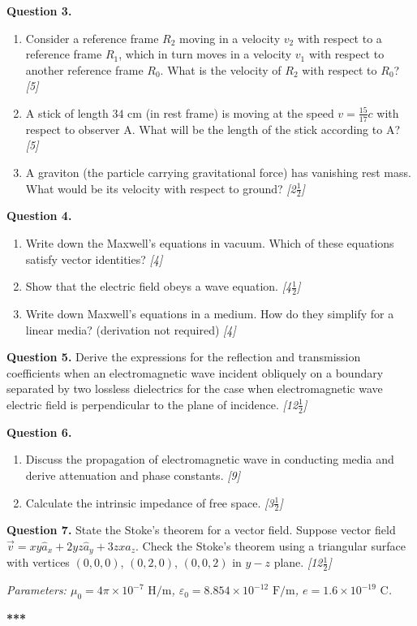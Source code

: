 \documentclass[11pt,a4paper]{article}
\newcommand{\pts}[1]{\hfill \textit{[#1]}}
\begin{document}
\bigskip

\noindent \textbf{Question 3.}
\begin{enumerate}[label=(\alph*)]
  \item Consider a reference frame $R_2$ moving in a velocity $v_2$ with respect to a reference frame $R_1$, which in turn moves in a velocity $v_1$ with respect to another reference frame $R_0$. What is the velocity of $R_2$ with respect to $R_0$? \pts{5}
  \item A stick of length $34\text{ cm}$ (in rest frame) is moving at the speed $v = \frac{15}{17}c$ with respect to observer A. What will be the length of the stick according to A? \pts{5}
  \item A graviton (the particle carrying gravitational force) has vanishing rest mass. What would be its velocity with respect to ground? \pts{2$\frac{1}{2}$}
\end{enumerate}

\bigskip

\noindent \textbf{Question 4.}
\begin{enumerate}[label=(\alph*)]
  \item Write down the Maxwell's equations in vacuum. Which of these equations satisfy vector identities? \pts{4}
  \item Show that the electric field obeys a wave equation. \pts{4$\frac{1}{2}$}
  \item Write down Maxwell's equations in a medium. How do they simplify for a linear media? (derivation not required) \pts{4}
\end{enumerate}

\bigskip

\noindent \textbf{Question 5.} Derive the expressions for the reflection and transmission coefficients when an electromagnetic wave incident obliquely on a boundary separated by two lossless dielectrics for the case when electromagnetic wave electric field is perpendicular to the plane of incidence. \pts{12$\frac{1}{2}$}

\bigskip

\noindent \textbf{Question 6.}
\begin{enumerate}[label=(\alph*)]
  \item Discuss the propagation of electromagnetic wave in conducting media and derive attenuation and phase constants. \pts{9}
  \item Calculate the intrinsic impedance of free space. \pts{3$\frac{1}{2}$}
\end{enumerate}

\bigskip

\noindent \textbf{Question 7.} State the Stoke's theorem for a vector field. Suppose vector field $\vec{v} = xy \hat{a}_x + 2yz \hat{a}_y + 3zx \hat{a}_z$. Check the Stoke's theorem using a triangular surface with vertices $(0,0,0)$, $(0,2,0)$, $(0,0,2)$ in $y-z$ plane. \pts{12$\frac{1}{2}$}

\smallskip
\noindent \textit{Parameters: $\mu_0 = 4\pi \times 10^{-7}\text{ H/m}$, $\varepsilon_0 = 8.854 \times 10^{-12}\text{ F/m}$, $e = 1.6 \times 10^{-19}\text{ C}$.}

\bigskip
\begin{center}
  \textbf{***}
\end{center}
\end{document}
